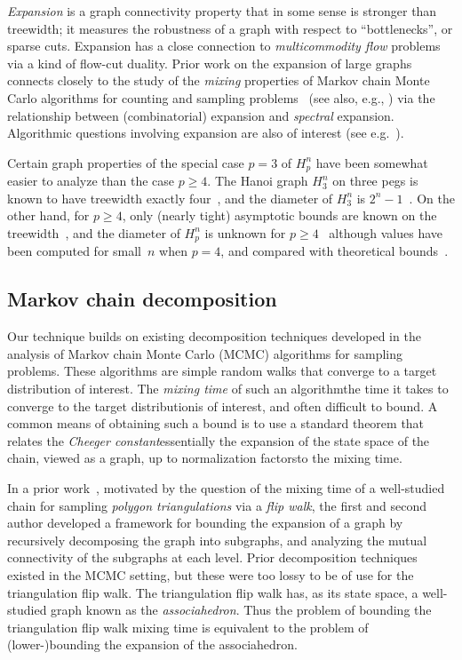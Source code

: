 \documentclass[
final
]{dmtcs-episciences}
\begin{document}
\emph{Expansion} is a graph connectivity property that in some sense is stronger than treewidth; it measures the robustness of a graph with respect to ``bottlenecks'', or sparse cuts. Expansion has a close connection to \emph{multicommodity flow} problems via a kind of flow-cut duality. Prior work on the expansion of large graphs~\citep{babaiszegedy, eppfrishtri, kaibelexp} connects closely to the study of the \emph{mixing} properties of Markov chain Monte Carlo algorithms for counting and sampling problems~\citep{sinclair_1992, levin2017markov} (see also, e.g., \citep{anari2}) via the relationship between (combinatorial) expansion and \emph{spectral} expansion. Algorithmic questions involving expansion are also of interest (see e.g.~\cite{arv}).

Certain graph properties of the special case $p = 3$ of $H_p^n$ have been somewhat easier to analyze than the case $p \geq 4$. The Hanoi graph $H_3^n$ on three pegs is known to have treewidth exactly four~\citep{hanoitw}, and the diameter of $H_3^n$ is $2^n - 1$~\citep{cartesian}. On the other hand, for $p \geq 4$, only (nearly tight) asymptotic bounds are known on the treewidth~\citep{hanoitw}, and the diameter of $H_p^n$ is unknown for $p \geq 4$~\citep{cartesian} although values have been computed for small~$n$ when $p = 4$, and compared with theoretical bounds~\citep{mythsmaths}.

\subsection{Markov chain decomposition}
Our technique builds on existing decomposition techniques developed in the analysis of Markov chain Monte Carlo (MCMC) algorithms for sampling problems. These algorithms are simple random walks that converge to a target distribution of interest. The \emph{mixing time} of such an algorithm\textemdash the time it takes to converge to the target distribution\textemdash is of interest, and often difficult to bound. A common means of obtaining such a bound is to use a standard theorem that relates the \emph{Cheeger constant}\textemdash essentially the expansion of the state space of the chain, viewed as a graph, up to normalization factors\textemdash to the mixing time.  

In a prior work~\citep{eppfrishtri}, motivated by the question of the mixing time of a well-studied~\citep{mct, molloylb}  chain for sampling \emph{polygon triangulations} via a \emph{flip walk}, the first and second author developed a framework for bounding the expansion of a graph by recursively decomposing the graph into subgraphs, and analyzing the mutual connectivity of the subgraphs at each level. Prior decomposition techniques existed in the MCMC setting, but these were too lossy to be of use for the triangulation flip walk. The triangulation flip walk has, as its state space, a well-studied graph known as the \emph{associahedron}. Thus the problem of bounding the triangulation flip walk mixing time is equivalent to the problem of (lower-)bounding the expansion of the associahedron.
\end{document}
